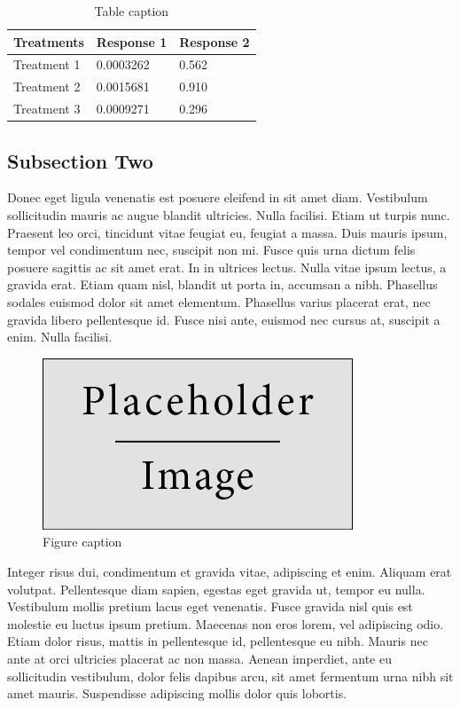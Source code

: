 \documentclass[preprint,12pt]{elsarticle}
\begin{document}
\begin{table}[h]
\centering
\begin{tabular}{l l l}
\hline
\textbf{Treatments} & \textbf{Response 1} & \textbf{Response 2}\\
\hline
Treatment 1 & 0.0003262 & 0.562 \\
Treatment 2 & 0.0015681 & 0.910 \\
Treatment 3 & 0.0009271 & 0.296 \\
\hline
\end{tabular}
\caption{Table caption}
\end{table}

\subsection{Subsection Two}

Donec eget ligula venenatis est posuere eleifend in sit amet diam. Vestibulum sollicitudin mauris ac augue blandit ultricies. Nulla facilisi. Etiam ut turpis nunc. Praesent leo orci, tincidunt vitae feugiat eu, feugiat a massa. Duis mauris ipsum, tempor vel condimentum nec, suscipit non mi. Fusce quis urna dictum felis posuere sagittis ac sit amet erat. In in ultrices lectus. Nulla vitae ipsum lectus, a gravida erat. Etiam quam nisl, blandit ut porta in, accumsan a nibh. Phasellus sodales euismod dolor sit amet elementum. Phasellus varius placerat erat, nec gravida libero pellentesque id. Fusce nisi ante, euismod nec cursus at, suscipit a enim. Nulla facilisi.

\begin{figure}[h]
\centering\includegraphics[width=0.4\linewidth]{placeholder}
\caption{Figure caption}
\end{figure}

Integer risus dui, condimentum et gravida vitae, adipiscing et enim. Aliquam erat volutpat. Pellentesque diam sapien, egestas eget gravida ut, tempor eu nulla. Vestibulum mollis pretium lacus eget venenatis. Fusce gravida nisl quis est molestie eu luctus ipsum pretium. Maecenas non eros lorem, vel adipiscing odio. Etiam dolor risus, mattis in pellentesque id, pellentesque eu nibh. Mauris nec ante at orci ultricies placerat ac non massa. Aenean imperdiet, ante eu sollicitudin vestibulum, dolor felis dapibus arcu, sit amet fermentum urna nibh sit amet mauris. Suspendisse adipiscing mollis dolor quis lobortis.
\end{document}
